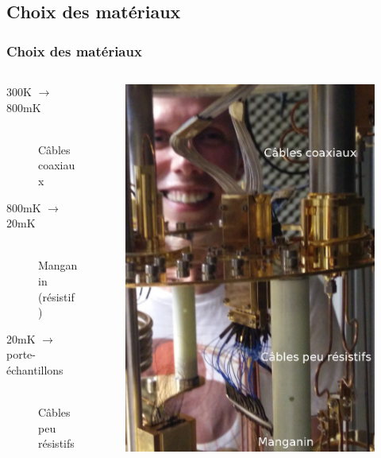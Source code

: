 \documentclass[8pt,a9paper]{beamer} \usepackage[utf8]{inputenc} \usepackage[francais]{babel} \usepackage[T1]{fontenc}
\begin{document}
\subsection{Choix des matériaux}
\begin{frame}
\frametitle{Choix des matériaux}
\begin{columns}
\begin{column}{0.6\textwidth}
    \begin{description}
        \item[300K $\rightarrow$ 800mK]~\\
            Câbles coaxiaux
        \item[\hspace*{11.5mm}800mK $\rightarrow$ 20mK]~\\
            Manganin (résistif)
        \item[\hspace*{24.5mm} 20mK $\rightarrow$ porte-échantillons]~\\
            Câbles peu résistifs
    \end{description}
\end{column}
\begin{column}{0.3\textwidth}
\begin{figure}[h]
    \begin{center}
        \includegraphics[width=\textwidth]{Images/Thermalisation/Etage_Tuteur}

\end{center}
\end{figure}
\end{column}
\end{columns}
\end{frame}
\end{document}
